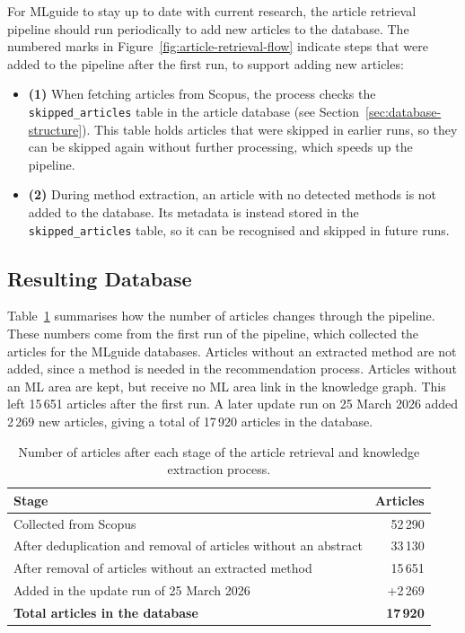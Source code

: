 For MLguide to stay up to date with current research, the article
retrieval pipeline should run periodically to add new articles to the
database. The numbered marks in Figure~\ref{fig:article-retrieval-flow}
indicate steps that were added to the pipeline after the first run, 
to support adding new articles:

\begin{itemize}
\item \textbf{(1)} When fetching articles from Scopus, the process
checks the \texttt{skipped\_articles} table in the article database
(see Section~\ref{sec:database-structure}). This table holds
articles that were skipped in earlier runs, so they can be skipped
again without further processing, which speeds up the pipeline.
\item \textbf{(2)} During method extraction, an article with no
detected methods is not added to the database. Its metadata is
instead stored in the \texttt{skipped\_articles} table, so it can
be recognised and skipped in future runs.
\end{itemize}

\subsection{Resulting Database}
\label{sec:resulting-database}

Table~\ref{tab:article-counts} summarises how the number of
articles changes through the pipeline. These numbers come from the
first run of the pipeline, which collected the articles for the
MLguide databases. Articles without an extracted method are not
added, since a method is needed in the recommendation process.
Articles without an ML area are kept, but receive no ML area link
in the knowledge graph. This left 15\,651 articles after the first
run. A later update run on 25 March 2026 added 2\,269 new articles,
giving a total of 17\,920 articles in the database.

\begin{table}[H]
\centering
\caption[Article counts at each stage]{Number of articles after
each stage of the article retrieval and knowledge extraction
process.}
\label{tab:article-counts}
\begin{tabularx}{0.8\textwidth}{Xr}
\toprule
\textbf{Stage} & \textbf{Articles} \\
\midrule
Collected from Scopus & 52\,290 \\
After deduplication and removal of articles without an abstract & 33\,130 \\
After removal of articles without an extracted method & 15\,651 \\
Added in the update run of 25 March 2026 & +2\,269 \\
\midrule
\textbf{Total articles in the database} & \textbf{17\,920} \\
\bottomrule
\end{tabularx}
\end{table}

